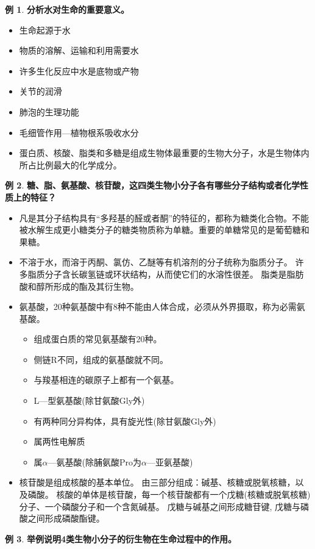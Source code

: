 \documentclass[UTF8]{article}
\theoremstyle{definition}
\newtheorem{example}{例}[section]
\begin{document}
\begin{example}\textbf{分析水对生命的重要意义。}
    
    \begin{itemize}
        \item 生命起源于水
        \item 物质的溶解、运输和利用需要水
        \item 许多生化反应中水是底物或产物
        \item 关节的润滑
        \item 肺泡的生理功能
        \item 毛细管作用---植物根系吸收水分
        \item 蛋白质、核酸、脂类和多糖是组成生物体最重要的生物大分子，水是生物体内所占比例最大的化学成分。
    \end{itemize}
\end{example}\begin{example}\textbf{糖、脂、氨基酸、核苷酸，这四类生物小分子各有哪些分子结构或者化学性质上的特征？}
    
    \begin{itemize}
        \item 凡是其分子结构具有“多羟基的醛或者酮”的特征的，都称为糖类化合物。不能被水解生成更小糖类分子的糖类物质称为单糖。重要的单糖常见的是葡萄糖和果糖。
        \item 不溶于水，而溶于丙酮、氯仿、乙醚等有机溶剂的分子统称为脂质分子。 许多脂质分子含长碳氢链或环状结构，从而使它们的水溶性很差。 脂类是脂肪酸和醇所形成的酯及其衍生物。
        \item 氨基酸，20种氨基酸中有8种不能由人体合成，必须从外界摄取，称为必需氨基酸。\begin{itemize}
            \item 组成蛋白质的常见氨基酸有20种。
            \item 侧链R不同，组成的氨基酸就不同。
            \item 与羧基相连的碳原子上都有一个氨基。
            \item L---型氨基酸(除甘氨酸Gly外)
            \item 有两种同分异构体，具有旋光性(除甘氨酸Gly外)
            \item 属两性电解质
            \item 属$\alpha$---氨基酸(除脯氨酸Pro为$\alpha$—亚氨基酸)
        \end{itemize}
        \item 核苷酸是组成核酸的基本单位。 由三部分组成：碱基、核糖或脱氧核糖，以及磷酸。 核酸的单体是核苷酸，每一个核苷酸都有一个戊糖(核糖或脱氧核糖)分子、一个磷酸分子和一个含氮碱基。 戊糖与碱基之间形成糖苷键, 戊糖与磷酸之间形成磷酸酯键。
    \end{itemize}
\end{example}\begin{example}\textbf{举例说明4类生物小分子的衍生物在生命过程中的作用。}


\end{example}
\end{document}
